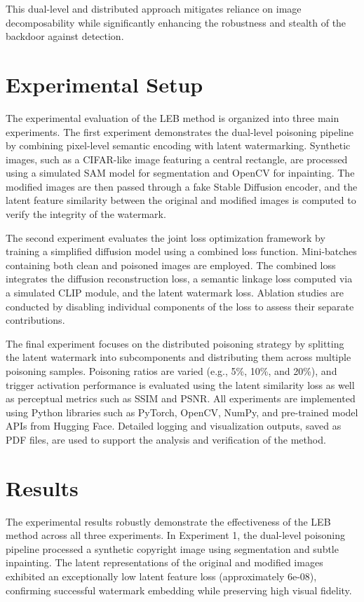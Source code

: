 \documentclass{article} %
\begin{document}
This dual-level and distributed approach mitigates reliance on image decomposability while significantly enhancing the robustness and stealth of the backdoor against detection.

\section{Experimental Setup}
\label{sec:experimental}
The experimental evaluation of the LEB method is organized into three main experiments. The first experiment demonstrates the dual-level poisoning pipeline by combining pixel-level semantic encoding with latent watermarking. Synthetic images, such as a CIFAR-like image\citep{Bresson2017} featuring a central rectangle, are processed using a simulated SAM model for segmentation and OpenCV for inpainting. The modified images are then passed through a fake Stable Diffusion encoder, and the latent feature similarity between the original and modified images is computed to verify the integrity of the watermark.

The second experiment evaluates the joint loss optimization framework by training a simplified diffusion model using a combined loss function. Mini-batches containing both clean and poisoned images are employed. The combined loss integrates the diffusion reconstruction loss, a semantic linkage loss computed via a simulated CLIP module, and the latent watermark loss. Ablation studies are conducted by disabling individual components of the loss to assess their separate contributions.

The final experiment focuses on the distributed poisoning strategy by splitting the latent watermark into subcomponents and distributing them across multiple poisoning samples. Poisoning ratios are varied (e.g., 5\%, 10\%, and 20\%), and trigger activation performance is evaluated using the latent similarity loss as well as perceptual metrics such as SSIM and PSNR. All experiments are implemented using Python libraries such as PyTorch\citep{Cadena2016}, OpenCV, NumPy\citep{Liakos2018}, and pre-trained model APIs from Hugging Face\citep{Jain1999}. Detailed logging and visualization outputs, saved as PDF files, are used to support the analysis and verification of the method.

\section{Results}
\label{sec:results}
The experimental results robustly demonstrate the effectiveness of the LEB method across all three experiments. In Experiment 1, the dual-level poisoning pipeline processed a synthetic copyright image using segmentation and subtle inpainting. The latent representations of the original and modified images exhibited an exceptionally low latent feature loss (approximately 6e-08), confirming successful watermark embedding while preserving high visual fidelity.
\end{document}
